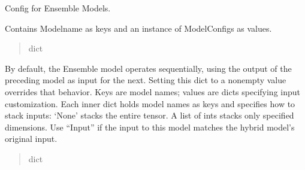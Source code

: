 \documentclass[letterpaper,10pt,english]{sphinxmanual}
\begin{document}
\begin{fulllineitems}
\label{\detokenize{api:hypyml.configs.HybridConfig}}
\pysigstartsignatures
{}
\pysigstopsignatures
\sphinxAtStartPar
Config for Ensemble Models.

\begin{fulllineitems}
\label{\detokenize{api:hypyml.configs.HybridConfig.models}}
\pysigstartsignatures
{}
\pysigstopsignatures
\sphinxAtStartPar
Contains Modelname as keys and an instance of ModelConfigs as values.
\begin{quote}\begin{description}
\sphinxAtStartPar
dict

\end{description}\end{quote}

\end{fulllineitems}


\begin{fulllineitems}
\label{\detokenize{api:hypyml.configs.HybridConfig.model_inputs}}
\pysigstartsignatures
{}
\pysigstopsignatures
\sphinxAtStartPar
By default, the Ensemble model operates sequentially, using the output of the preceding model as input for the next.
Setting this dict to a non\sphinxhyphen{}empty value overrides that behavior.
Keys are model names; values are dicts specifying input customization.
Each inner dict holds model names as keys and specifies how to stack inputs:
\sphinxhyphen{} ‘None’ stacks the entire tensor.
\sphinxhyphen{} A list of ints stacks only specified dimensions.
Use “Input” if the input to this model matches the hybrid model’s original input.
\begin{quote}\begin{description}
\sphinxAtStartPar
dict


\end{description}
\end{quote}
\end{fulllineitems}
\end{fulllineitems}
\end{document}
